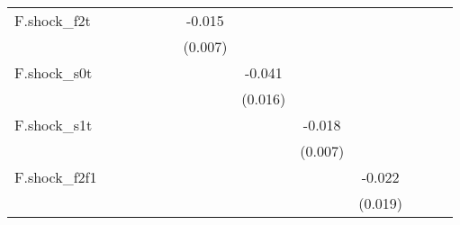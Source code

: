 {\begin{tabular}{l*{12}{c}}
\addlinespace
F.shock\_f2t &                     &                     &                     &                     &                     &      -0.015\sym{**} &                     &                     &                     &                     &                     &                     \\
            &                     &                     &                     &                     &                     &     (0.007)         &                     &                     &                     &                     &                     &                     \\
\addlinespace
F.shock\_s0t &                     &                     &                     &                     &                     &                     &      -0.041\sym{**} &                     &                     &                     &                     &                     \\
            &                     &                     &                     &                     &                     &                     &     (0.016)         &                     &                     &                     &                     &                     \\
\addlinespace
F.shock\_s1t &                     &                     &                     &                     &                     &                     &                     &      -0.018\sym{**} &                     &                     &                     &                     \\
            &                     &                     &                     &                     &                     &                     &                     &     (0.007)         &                     &                     &                     &                     \\
\addlinespace
F.shock\_f2f1&                     &                     &                     &                     &                     &                     &                     &                     &      -0.022         &                     &                     &                     \\
            &                     &                     &                     &                     &                     &                     &                     &                     &     (0.019)         &                     &                     &                     \\

\end{tabular}}
